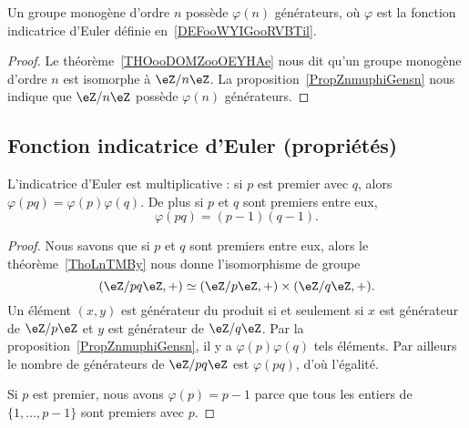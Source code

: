 \begin{corollary}\label{CORooMBLSooMHKmAq}
	Un groupe monogène d'ordre \( n\) possède \( \varphi(n)\) générateurs, où \( \varphi\) est la fonction indicatrice d'Euler définie en~\ref{DEFooWYIGooRVBTil}.
\end{corollary}

\begin{proof}
	Le théorème~\ref{THOooDOMZooOEYHAe} nous dit qu'un groupe monogène d'ordre \( n\) est isomorphe à \( \eZ/n\eZ\). La proposition~\ref{PropZnmuphiGensn} nous indique que \( \eZ/n\eZ\) possède \( \varphi(n)\) générateurs.
\end{proof}

\subsection{Fonction indicatrice d'Euler (propriétés)}
\label{subSecKGDFooAbETjs}

\begin{corollary}       \label{CorlvTmsf}
	L'indicatrice d'Euler est multiplicative : si \( p\) est premier avec \( q\), alors \( \varphi(pq)=\varphi(p)\varphi(q)\). De plus si \( p\) et \( q\) sont premiers entre eux,
	\begin{equation}
		\varphi(pq)=(p-1)(q-1).
	\end{equation}
\end{corollary}

\begin{proof}
	Nous savons que si \( p\) et \( q\) sont premiers entre eux, alors le théorème~\ref{ThoLnTMBy} nous donne l'isomorphisme de groupe
	\begin{equation}
		(\eZ/pq\eZ,+)\simeq(\eZ/p\eZ,+)\times(\eZ/q\eZ,+).
	\end{equation}
	Un élément \( (x,y)\) est générateur du produit si et seulement si \( x\) est générateur de \( \eZ/p\eZ\) et \( y\) est générateur de \( \eZ/q\eZ\). Par la proposition~\ref{PropZnmuphiGensn}, il y a \( \varphi(p)\varphi(q)\) tels éléments. Par ailleurs le nombre de générateurs de \( \eZ/pq\eZ\) est \( \varphi(pq)\), d'où l'égalité.

	Si \( p\) est premier, nous avons \( \varphi(p)=p-1\) parce que tous les entiers de \( \{ 1,\ldots, p-1 \}\) sont premiers avec \( p\).
\end{proof}

